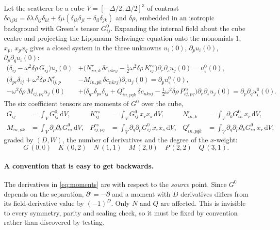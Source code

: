 \documentclass[11pt,a4paper]{article}
\newcommand{\D}{\Delta}
\newcommand{\dd}{\mathrm{d}}
\newcommand{\Gz}{G^{0}}
\newcommand{\half}{\tfrac{1}{2}}
\begin{document}
Let the scatterer be a cube $V=[-\D/2,\D/2]^3$ of contrast
$\delta c_{ijkl}=\delta\lambda\,\delta_{ij}\delta_{kl}
+\delta\mu(\delta_{ik}\delta_{jl}+\delta_{il}\delta_{jk})$ and $\delta\rho$,
embedded in an isotropic background with Green's tensor $\Gz_{ij}$. Expanding
the internal field about the cube centre and projecting the
Lippmann--Schwinger equation onto the monomials $1$, $x_p$, $x_px_q$ gives a
closed system in the three unknowns $u_i(0)$, $\partial_pu_i(0)$,
$\partial_p\partial_qu_i(0)$:
\begin{align}
\bigl(\delta_{ij}-\omega^2\delta\rho\,G_{ij}\bigr)u_j(0)
  &+\bigl(N^{r}_{in,k}\,\delta c_{nksj}
  -\half\omega^2\delta\rho\,K^{rs}_{ij}\bigr)\partial_r\partial_su_j(0)
  = u^0_i(0), \label{eq:A11}\\[2pt]
\bigl(\delta_{pr}\delta_{ij}+\omega^2\delta\rho\,N^{r}_{ij,p}
  &-M_{in,pk}\,\delta c_{nkrj}\bigr)\partial_ru_j(0)
  = \partial_pu^0_i(0), \label{eq:A22}\\[2pt]
-\omega^2\delta\rho\,M_{ij,pq}u_j(0)
  &+\bigl(\delta_{qr}\delta_{ps}\delta_{ij}+Q^{r}_{in,pqk}\,\delta c_{nksj}
  -\half\omega^2\delta\rho\,P^{rs}_{ij,pq}\bigr)\partial_r\partial_su_j(0)
  = \partial_p\partial_qu^0_i(0). \label{eq:A33}
\end{align}
The six coefficient tensors are moments of $\Gz$ over the cube,
\begin{equation}
\begin{aligned}
G_{ij}&=\int_V \Gz_{ij}\,\dd V, &
K^{rs}_{ij}&=\int_V \Gz_{ij}\,x_rx_s\,\dd V, &
N^{r}_{in,k}&=\int_V \partial_k\Gz_{in}\,x_r\,\dd V,\\
M_{in,pk}&=\int_V \partial_p\partial_k\Gz_{in}\,\dd V, &
P^{rs}_{ij,pq}&=\int_V \partial_q\partial_p\Gz_{ij}\,x_rx_s\,\dd V, &
Q^{r}_{in,pqk}&=\int_V \partial_q\partial_p\partial_k\Gz_{in}\,x_r\,\dd V,
\end{aligned}
\label{eq:moments}
\end{equation}
graded by $(D,W)$, the number of derivatives and the degree of the $x$-weight:
\[
G\,(0,0)\quad K\,(0,2)\quad N\,(1,1)\quad M\,(2,0)\quad P\,(2,2)\quad Q\,(3,1).
\]

\paragraph{A convention that is easy to get backwards.} The derivatives in
\eqref{eq:moments} are with respect to the \emph{source} point. Since $\Gz$
depends on the separation, $\partial' = -\partial$ and a moment with $D$
derivatives differs from its field-derivative value by $(-1)^D$. Only $N$ and
$Q$ are affected. This is invisible to every symmetry, parity and scaling
check, so it must be fixed by convention rather than discovered by testing.
\end{document}

